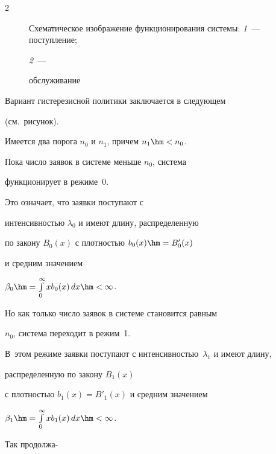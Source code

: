 \begin{multicols}{2}
\begin{figure}
\begin{center}


\end{center}


\begin{center}


{\small Схематическое изображение функционирования системы: \textit{1}~--- поступление; 


\textit{2}~---


обслуживание}


 \end{center}


\end{figure}











Вариант гистерезисной политики заключается в следующем


(см.\ рисунок).


Имеется два порога $n_0$ и $n_1$, причем $n_1\hm<n_0$.


Пока число заявок в системе меньше $n_0$, система


функционирует в режиме~0.


Это означает, что заявки поступают с


интенсивностью $\lambda_0$ и имеют длину, распределенную


по закону $B_0(x)$ с плот\-ностью $b_0(x)\hm=B'_0(x)$


и средним значением


$\beta_0\hm=\int\limits_0^\infty x b_0(x)\, dx\hm<\infty$.


Но как только число заявок в системе становится равным


$n_0$, система переходит в режим~1.


В~этом режиме заявки поступают с интенсивностью~$\lambda_1$ и имеют длину, 


распределенную по закону $B_1(x)$


с плотностью $b_1(x)=B'_1(x)$ и средним значением


$\beta_1\hm=\int\limits_0^\infty x b_1(x)\, dx\hm<\infty$.


Так продолжа-\linebreak\vspace*{-12pt}





\pagebreak






\end{multicols}
